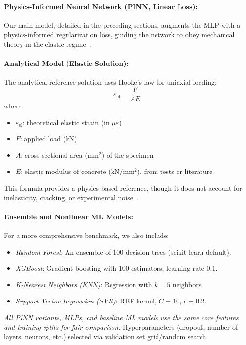 \documentclass{article}
\begin{document}
\paragraph{Physics-Informed Neural Network (PINN, Linear Loss):}
Our main model, detailed in the preceding sections, augments the MLP with a physics-informed regularization loss, guiding the network to obey mechanical theory in the elastic regime~\cite{raissi2019physics, fan2023pinn, Cuomo2022}.

\paragraph{Analytical Model (Elastic Solution):}
The analytical reference solution uses Hooke's law for uniaxial loading:
\begin{equation}
\varepsilon_{\text{el}} = \frac{F}{A E}
\end{equation}
where:
\begin{itemize}
    \item $\varepsilon_{\text{el}}$: theoretical elastic strain (in $\mu\varepsilon$)
    \item $F$: applied load (kN)
    \item $A$: cross-sectional area (mm$^2$) of the specimen~\cite{yeganeh2023shear}
    \item $E$: elastic modulus of concrete (kN/mm$^2$), from tests or literature
\end{itemize}
This formula provides a physics-based reference, though it does not account for inelasticity, cracking, or experimental noise~\cite{chao2024review}.

\paragraph{Ensemble and Nonlinear ML Models:}
For a more comprehensive benchmark, we also include:
\begin{itemize}
    \item \emph{Random Forest}: An ensemble of 100 decision trees (scikit-learn default).
    \item \emph{XGBoost}: Gradient boosting with 100 estimators, learning rate 0.1.
    \item \emph{K-Nearest Neighbors (KNN)}: Regression with $k=5$ neighbors.
    \item \emph{Support Vector Regression (SVR)}: RBF kernel, $C=10$, $\epsilon=0.2$.
\end{itemize}

\emph{All PINN variants, MLPs, and baseline ML models use the same core features and training splits for fair comparison.} Hyperparameters (dropout, number of layers, neurons, etc.) selected via validation set grid/random search.
\end{document}
